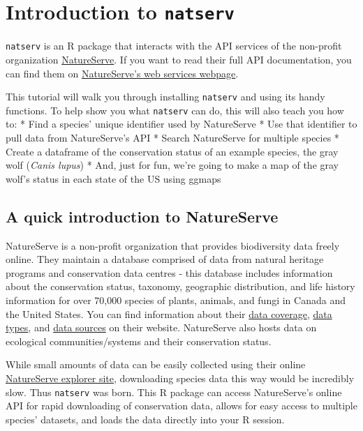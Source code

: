 \documentclass[]{article}
\title{}
\author{}
\date{}
\begin{document}
\hypertarget{introduction-to-natserv}{%
\section{\texorpdfstring{Introduction to
\texttt{natserv}}{Introduction to natserv}}\label{introduction-to-natserv}}

\texttt{natserv} is an R package that interacts with the API services of
the non-profit organization
\href{https://services.natureserve.org/}{NatureServe}. If you want to
read their full API documentation, you can find them on
\href{https://services.natureserve.org/BrowseServices/getSpeciesData/getSpeciesListREST.jsp}{NatureServe's
web services webpage}.

This tutorial will walk you through installing \texttt{natserv} and
using its handy functions. To help show you what \texttt{natserv} can
do, this will also teach you how to: * Find a species' unique identifier
used by NatureServe * Use that identifier to pull data from
NatureServe's API * Search NatureServe for multiple species * Create a
dataframe of the conservation status of an example species, the gray
wolf (\emph{Canis lupus}) * And, just for fun, we're going to make a map
of the gray wolf's status in each state of the US using ggmaps

\hypertarget{a-quick-introduction-to-natureserve}{%
\subsection{A quick introduction to
NatureServe}\label{a-quick-introduction-to-natureserve}}

NatureServe is a non-profit organization that provides biodiversity data
freely online. They maintain a database comprised of data from natural
heritage programs and conservation data centres - this database includes
information about the conservation status, taxonomy, geographic
distribution, and life history information for over 70,000 species of
plants, animals, and fungi in Canada and the United States. You can find
information about their
\href{http://explorer.natureserve.org/summary.htm}{data coverage},
\href{http://explorer.natureserve.org/methods.htm}{data types}, and
\href{http://explorer.natureserve.org/sources.htm}{data sources} on
their website. NatureServe also hosts data on ecological
communities/systems and their conservation status.

While small amounts of data can be easily collected using their online
\href{http://explorer.natureserve.org/}{NatureServe explorer site},
downloading species data this way would be incredibly slow. Thus
\texttt{natserv} was born. This R package can access NatureServe's
online API for rapid downloading of conservation data, allows for easy
access to multiple species' datasets, and loads the data directly into
your R session.
\end{document}
